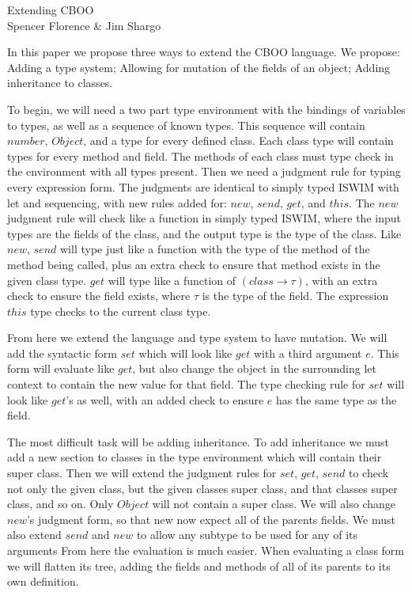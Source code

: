 \documentclass[]{letter}
\begin{document}
\begin{center}
  Extending CBOO\\
  Spencer Florence \& Jim Shargo
\end{center}

In this paper we propose three ways to extend the CBOO language.
We propose: Adding a type system; Allowing for mutation of the fields of an object; Adding inheritance to classes.


To begin, we will need a two part type environment with the bindings of variables to types, as well as a sequence of known types.
This sequence will contain $number$, $Object$, and a type for every defined class.
Each class type will contain types for every method and field. 
The methods of each class must type check in the environment with all types present.
Then we need a judgment rule for typing every expression form.
The judgments are identical to simply typed ISWIM with let and sequencing, with new rules added for: $new$, $send$, $get$, and $this$.
The $new$ judgment rule will check like a function in simply typed ISWIM, where the input types are the fields of the class, and the output type is the type of the class.
Like $new$, $send$ will type just like a function with the type of the method of the method being called, plus an extra check to ensure that method exists in the given class type.
$get$ will type like a function of $(class \to \tau)$, with an extra check to ensure the field exists, where $\tau$ is the type of the field. %
The expression $this$ type checks to the current class type.

From here we extend the language and type system to have mutation.
We will add the syntactic form $set$ which will look like $get$ with a third argument $e$.
This form will evaluate like $get$, but also change the object in the surrounding let context to contain the new value for that field.
The type checking rule for $set$ will look like $get$'s as well, with an added check to ensure $e$ has the same type as the field.

The most difficult task will be adding inheritance.
To add inheritance we must add a new section to classes in the type environment which will contain their super class.
Then we will extend the judgment rules for $set$, $get$, $send$ to check not only the given class, but the given classes super class, and that classes super class, and so on.
Only $Object$ will not contain a super class.
We will also change $new$'s judgment form, so that new now expect all of the parents fields.
We must also extend $send$ and $new$ to allow any subtype to be used for any of its arguments %
From here the evaluation is much easier.
When evaluating a class form we will flatten its tree, adding the fields and methods of all of its parents to its own definition.
\end{document}
